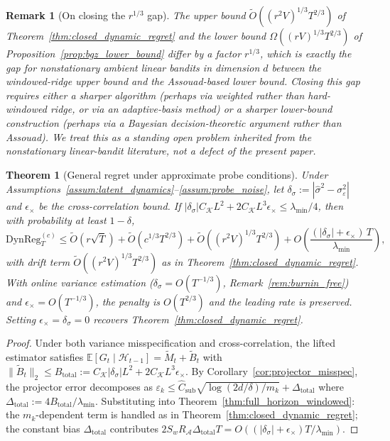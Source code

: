 \documentclass[11pt]{article}
\newcommand{\E}{\mathbb{E}}
\newcommand{\cA}{\mathcal{A}}
\newcommand{\cH}{\mathcal{H}}
\newcommand{\DynReg}{\mathrm{DynReg}}
\newtheorem{theorem}{Theorem}
\newtheorem{remark}{Remark}
\begin{document}
\begin{remark}[On closing the $r^{1/3}$ gap]
\label{rem:r_gap}
The upper bound $\widetilde O((r^2V)^{1/3}T^{2/3})$ of
Theorem~\ref{thm:closed_dynamic_regret} and the lower bound
$\Omega((rV)^{1/3}T^{2/3})$ of Proposition~\ref{prop:bgz_lower_bound} differ
by a factor $r^{1/3}$, which is exactly the gap for nonstationary ambient
linear bandits in dimension $d$ between the windowed-ridge upper bound and
the Assouad-based lower bound.  Closing this gap requires either a sharper
algorithm (perhaps via weighted rather than hard-windowed ridge, or via an
adaptive-basis method) or a sharper lower-bound construction (perhaps via a
Bayesian decision-theoretic argument rather than Assouad).  We treat this as
a standing open problem inherited from the nonstationary linear-bandit
literature, not a defect of the present paper.
\end{remark}

\begin{theorem}[General regret under approximate probe conditions]
\label{thm:closed_dynamic_regret_general}
Under Assumptions~\ref{assum:latent_dynamics}--\ref{assum:probe_noise},
let $\delta_\sigma:=|\hat\sigma^2-\sigma_\varepsilon^2|$ and $\epsilon_\times$
be the cross-correlation bound.
If $|\delta_\sigma|C_{\mathcal{K}}L^2+2C_{\mathcal{K}}L^3\epsilon_\times
\le\lambda_{\min}/4$, then with probability at least $1-\delta$,
\begin{equation}
\DynReg_T^{(c)}\le
\widetilde{O}(r\sqrt{T})+\widetilde{O}(c^{1/3}T^{2/3})+\widetilde{O}((r^2V)^{1/3}T^{2/3})
+O\!\left(\frac{(|\delta_\sigma|+\epsilon_\times)\,T}{\lambda_{\min}}\right),
\label{eq:general_bound}
\end{equation}
with drift term $\widetilde O((r^2V)^{1/3}T^{2/3})$ as in
Theorem~\ref{thm:closed_dynamic_regret}.
With online variance estimation ($\delta_\sigma=O(T^{-1/3})$,
Remark~\ref{rem:burnin_free}) and $\epsilon_\times=O(T^{-1/3})$, the penalty is
$O(T^{2/3})$ and the leading rate is preserved.
Setting $\epsilon_\times=\delta_\sigma=0$ recovers
Theorem~\ref{thm:closed_dynamic_regret}.
\end{theorem}

\begin{proof}
Under both variance misspecification and cross-correlation, the lifted estimator
satisfies $\E[G_t\mid\cH_{t-1}]=\widetilde{M}_t+\widetilde{B}_t$ with
$\|\widetilde{B}_t\|_2\le B_{\mathrm{total}}
:=C_{\mathcal{K}}|\delta_\sigma|L^2+2C_{\mathcal{K}}L^3\epsilon_\times$.
By Corollary~\ref{cor:projector_misspec}, the projector error decomposes as
$\varepsilon_k\le\hat{C}_{\mathrm{sub}}\sqrt{\log(2d/\delta)/m_k}
+\Delta_{\mathrm{total}}$
where $\Delta_{\mathrm{total}}:=4B_{\mathrm{total}}/\lambda_{\min}$.
Substituting into Theorem~\ref{thm:full_horizon_windowed}: the $m_k$-dependent
term is handled as in Theorem~\ref{thm:closed_dynamic_regret}; the constant bias
$\Delta_{\mathrm{total}}$ contributes
$2S_wR_{\cA}\Delta_{\mathrm{total}}T
= O((|\delta_\sigma|+\epsilon_\times)T/\lambda_{\min})$.
\end{proof}
\end{document}
